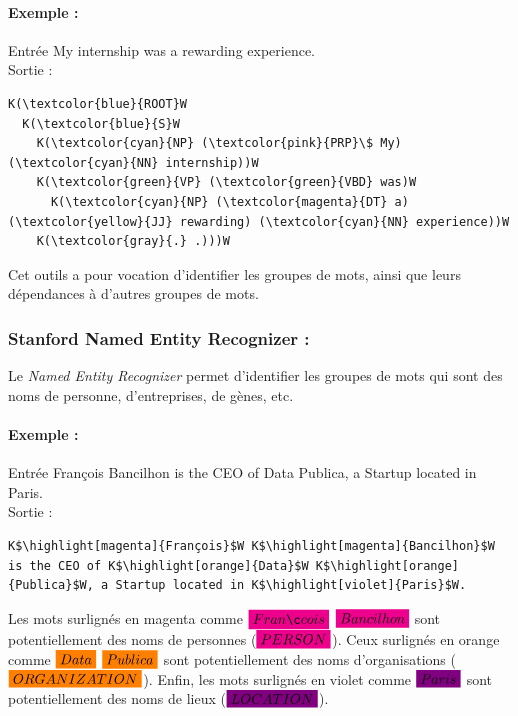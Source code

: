                 \paragraph{Exemple :}
                Entrée \og My internship was a rewarding experience.\fg\\
                Sortie :
\begin{lstlisting}
K(\textcolor{blue}{ROOT}W
  K(\textcolor{blue}{S}W
    K(\textcolor{cyan}{NP} (\textcolor{pink}{PRP}\$ My) (\textcolor{cyan}{NN} internship))W
    K(\textcolor{green}{VP} (\textcolor{green}{VBD} was)W
      K(\textcolor{cyan}{NP} (\textcolor{magenta}{DT} a) (\textcolor{yellow}{JJ} rewarding) (\textcolor{cyan}{NN} experience))W
    K(\textcolor{gray}{.} .)))W
\end{lstlisting}
                Cet outils a pour vocation d'identifier les groupes de mots, ainsi que leurs dépendances à d'autres groupes de mots.

            \subsubsection{Stanford Named Entity Recognizer :}
                Le \textit{Named Entity Recognizer} permet d'identifier les groupes de mots qui sont des noms de personne, d'entreprises, de gènes, etc.

                \paragraph{Exemple :}
                Entrée \og François Bancilhon is the CEO of Data Publica, a Startup located in Paris.\fg\\
                Sortie :
\begin{lstlisting}
K$\highlight[magenta]{François}$W K$\highlight[magenta]{Bancilhon}$W is the CEO of K$\highlight[orange]{Data}$W K$\highlight[orange]{Publica}$W, a Startup located in K$\highlight[violet]{Paris}$W.
\end{lstlisting}
                Les mots surlignés en magenta comme $\highlight[magenta]{François}$ $\highlight[magenta]{Bancilhon}$ sont potentiellement des noms de personnes (\textit{$\highlight[magenta]{PERSON}$}). Ceux surlignés en orange comme $\highlight[orange]{Data}$ $\highlight[orange]{Publica}$ sont potentiellement des noms d'organisations (\textit{$\highlight[orange]{ORGANIZATION}$}). Enfin, les mots surlignés en violet comme $\highlight[violet]{Paris}$ sont potentiellement des noms de lieux (\textit{$\highlight[violet]{LOCATION}$}).


